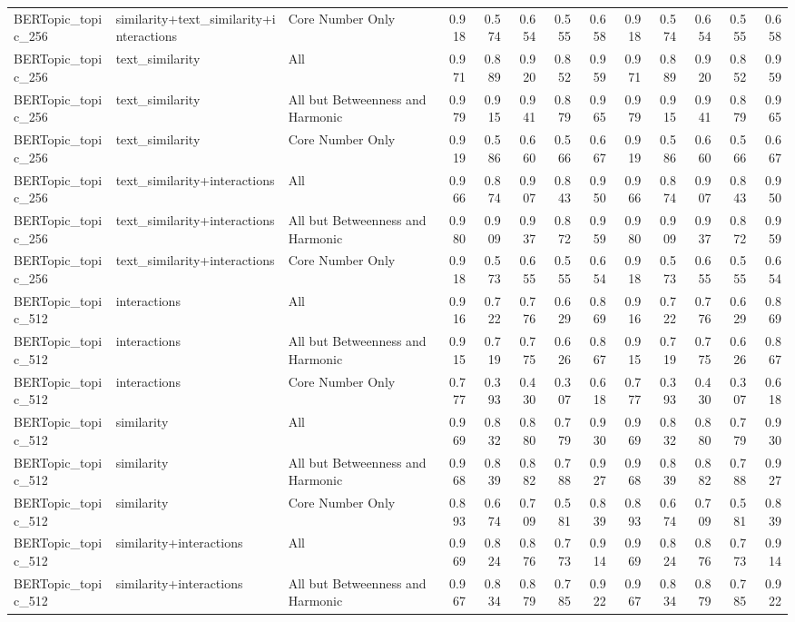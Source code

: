 \begin{tabular}{lllrrrrrrrrrr}
BERTopic_topic_256 & similarity+text_similarity+interactions & Core Number Only & 0.918 & 0.574 & 0.654 & 0.555 & 0.658 & 0.918 & 0.574 & 0.654 & 0.555 & 0.658 \\
BERTopic_topic_256 & text_similarity & All & 0.971 & 0.889 & 0.920 & 0.852 & 0.959 & 0.971 & 0.889 & 0.920 & 0.852 & 0.959 \\
BERTopic_topic_256 & text_similarity & All but Betweenness and Harmonic & 0.979 & 0.915 & 0.941 & 0.879 & 0.965 & 0.979 & 0.915 & 0.941 & 0.879 & 0.965 \\
BERTopic_topic_256 & text_similarity & Core Number Only & 0.919 & 0.586 & 0.660 & 0.566 & 0.667 & 0.919 & 0.586 & 0.660 & 0.566 & 0.667 \\
BERTopic_topic_256 & text_similarity+interactions & All & 0.966 & 0.874 & 0.907 & 0.843 & 0.950 & 0.966 & 0.874 & 0.907 & 0.843 & 0.950 \\
BERTopic_topic_256 & text_similarity+interactions & All but Betweenness and Harmonic & 0.980 & 0.909 & 0.937 & 0.872 & 0.959 & 0.980 & 0.909 & 0.937 & 0.872 & 0.959 \\
BERTopic_topic_256 & text_similarity+interactions & Core Number Only & 0.918 & 0.573 & 0.655 & 0.555 & 0.654 & 0.918 & 0.573 & 0.655 & 0.555 & 0.654 \\
BERTopic_topic_512 & interactions & All & 0.916 & 0.722 & 0.776 & 0.629 & 0.869 & 0.916 & 0.722 & 0.776 & 0.629 & 0.869 \\
BERTopic_topic_512 & interactions & All but Betweenness and Harmonic & 0.915 & 0.719 & 0.775 & 0.626 & 0.867 & 0.915 & 0.719 & 0.775 & 0.626 & 0.867 \\
BERTopic_topic_512 & interactions & Core Number Only & 0.777 & 0.393 & 0.430 & 0.307 & 0.618 & 0.777 & 0.393 & 0.430 & 0.307 & 0.618 \\
BERTopic_topic_512 & similarity & All & 0.969 & 0.832 & 0.880 & 0.779 & 0.930 & 0.969 & 0.832 & 0.880 & 0.779 & 0.930 \\
BERTopic_topic_512 & similarity & All but Betweenness and Harmonic & 0.968 & 0.839 & 0.882 & 0.788 & 0.927 & 0.968 & 0.839 & 0.882 & 0.788 & 0.927 \\
BERTopic_topic_512 & similarity & Core Number Only & 0.893 & 0.674 & 0.709 & 0.581 & 0.839 & 0.893 & 0.674 & 0.709 & 0.581 & 0.839 \\
BERTopic_topic_512 & similarity+interactions & All & 0.969 & 0.824 & 0.876 & 0.773 & 0.914 & 0.969 & 0.824 & 0.876 & 0.773 & 0.914 \\
BERTopic_topic_512 & similarity+interactions & All but Betweenness and Harmonic & 0.967 & 0.834 & 0.879 & 0.785 & 0.922 & 0.967 & 0.834 & 0.879 & 0.785 & 0.922 \\

\end{tabular}
